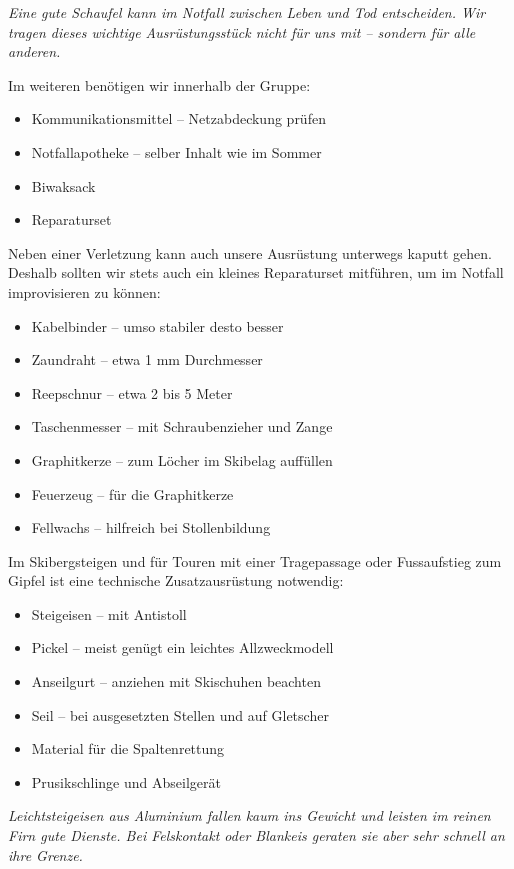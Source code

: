 \textit{Eine gute Schaufel kann im Notfall zwischen Leben und Tod entscheiden. Wir tragen dieses wichtige Ausrüstungsstück nicht für uns mit -- sondern für alle anderen.}

Im weiteren benötigen wir innerhalb der Gruppe:

\begin{itemize}
  \item{Kommunikationsmittel -- Netzabdeckung prüfen}
  \item{Notfallapotheke -- selber Inhalt wie im Sommer}
  \item{Biwaksack}
  \item{Reparaturset}
\end{itemize}

Neben einer Verletzung kann auch unsere Ausrüstung unterwegs kaputt gehen.
Deshalb sollten wir stets auch ein kleines Reparaturset mitführen, um im Notfall improvisieren zu können:

\begin{itemize}
  \item{Kabelbinder -- umso stabiler desto besser}
  \item{Zaundraht -- etwa 1 mm Durchmesser}
  \item{Reepschnur -- etwa 2 bis 5 Meter}
  \item{Taschenmesser -- mit Schraubenzieher und Zange}
  \item{Graphitkerze -- zum Löcher im Skibelag auffüllen}
  \item{Feuerzeug -- für die Graphitkerze}
  \item{Fellwachs -- hilfreich bei Stollenbildung}
\end{itemize}

\newcolumn

Im Skibergsteigen und für Touren mit einer Tragepassage oder Fussaufstieg zum Gipfel ist eine technische Zusatzausrüstung notwendig:

\begin{itemize}
  \item{Steigeisen -- mit Antistoll}
  \item{Pickel -- meist genügt ein leichtes Allzweckmodell}
  \item{Anseilgurt -- anziehen mit Skischuhen beachten}
  \item{Seil -- bei ausgesetzten Stellen und auf Gletscher}
  \item{Material für die Spaltenrettung}
  \item{Prusikschlinge und Abseilgerät}
\end{itemize}

\textit{Leichtsteigeisen aus Aluminium fallen kaum ins Gewicht und leisten im reinen Firn gute Dienste. Bei Felskontakt oder Blankeis geraten sie aber sehr schnell an ihre Grenze.}
